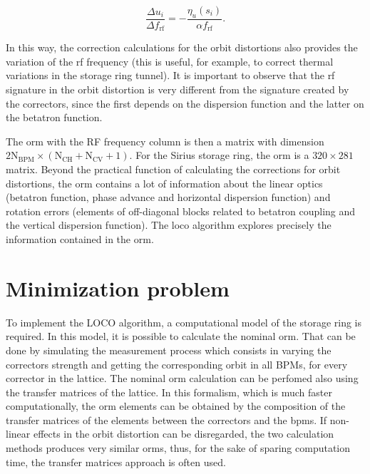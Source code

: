 \begin{equation}
    \dfrac{\Delta u_i}{ \Delta f_{\mathrm{rf}}} = - \dfrac{\eta_u(s_i)}{\alpha f_{\mathrm{rf}}}.
\end{equation}

In this way, the correction calculations for the orbit distortions also provides the variation of the \gls{rf} frequency (this is useful, for example, to correct thermal variations in the storage ring tunnel). It is important to observe that the \gls{rf} signature in the orbit distortion is very different from the signature created by the correctors, since the first depends on the dispersion function and the latter on the betatron function.

The \gls{orm} with the RF frequency column is then a matrix with dimension $2 \mathrm{N}_{\mathrm{BPM}} \times \left(\mathrm{N}_{\mathrm{CH}} + \mathrm{N}_{\mathrm{CV}}+1\right)$. For the Sirius storage ring, the \gls{orm} is a $320 \times 281$ matrix. Beyond the practical function of calculating the corrections for orbit distortions, the \gls{orm} contains a lot of information about the linear optics (betatron function, phase advance and horizontal dispersion function) and rotation errors (elements of off-diagonal blocks related to betatron coupling and the vertical dispersion function). The \gls{loco} algorithm explores precisely the information contained in the \gls{orm}.






\section{Minimization problem}

To implement the LOCO algorithm, a computational model of the storage ring is required. In this model, it is possible to calculate the nominal \gls{orm}. That can be done by simulating the measurement process which consists in varying the correctors strength and getting the corresponding orbit in all BPMs, for every corrector in the lattice. The nominal \gls{orm} calculation can be perfomed also using the transfer matrices of the lattice. In this formalism, which is much faster computationally, the \gls{orm} elements can be obtained by the composition of the transfer matrices of the elements between the correctors and the \gls{bpm}s. If non-linear effects in the orbit distortion can be disregarded, the two calculation methods produces very similar \gls{orm}s, thus, for the sake of sparing computation time, the transfer matrices approach is often used.

